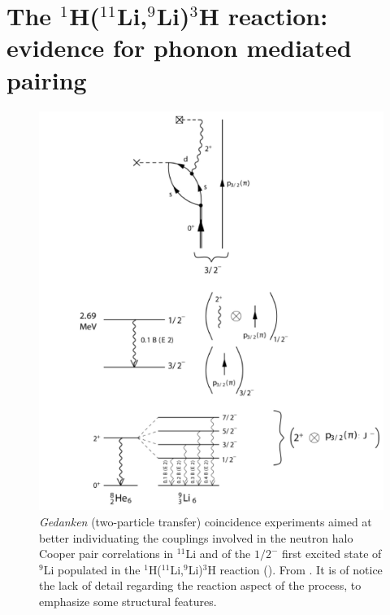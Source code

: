  \section[Evidence for phonon mediated pairing]{The $^1$H($^{11}$Li,$^9$Li)$^3$H reaction: evidence for phonon mediated pairing}\label{C8S1}
    \begin{figure}
    \centerline{\includegraphics*[width=16cm,angle=0]{C8/figsC8/fig8_1_3x}}
    	\caption{\emph{Gedanken} (two-particle transfer) coincidence experiments aimed at better individuating the couplings involved in the neutron halo Cooper pair correlations in $^{11}$Li and of the $1/2^-$ first excited state of $^9$Li populated in the  
    	 $^1$H($^{11}$Li,$^9$Li)$^3$H  reaction (\cite{Tanihata:08,Barranco:01,Potel:10}). From \cite{Potel:14}. It is of notice the lack of detail regarding the reaction aspect of the process, to emphasize some structural features.}\label{fig8_1_3}
    \end{figure}
